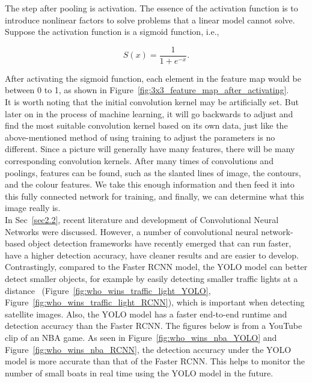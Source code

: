 The step after pooling is activation. The essence of the activation function is to introduce nonlinear factors to solve problems that a linear model cannot solve. Suppose the activation function is a sigmoid function, i.e.,

\begin{equation}
    S(x) =  \frac{\mathrm{1} }{\mathrm{1} + e^{-x} }.
\end{equation}

After activating the sigmoid function, each element in the feature map would be between 0 to 1, as shown in Figure~\ref{fig:3x3_feature_map_after_activating}.\\

It is worth noting that the initial convolution kernel may be artificially set. But later on in the process of machine learning, it will go backwards to adjust and find the most suitable convolution kernel based on its own data, just like the above-mentioned method of using training to adjust the parameters is no different. Since a picture will generally have many features, there will be many corresponding convolution kernels. After many times of convolutions and poolings, features can be found, such as the slanted lines of image, the contours, and the colour features. We take this enough information and then feed it into this fully connected network for training, and finally, we can determine what this image really is.\\

In Sec~\ref{sec2.2}, recent literature and development of Convolutional Neural Networks were discussed. However, a number of convolutional neural network-based object detection frameworks have recently emerged that can run faster, have a higher detection accuracy, have cleaner results and are easier to develop. Contrastingly, compared to the Faster RCNN model, the YOLO model can better detect smaller objects, for example by easily detecting smaller traffic lights at a distance~\cite{Dwivedi2020YOLOv5} (Figure~\ref{fig:who_wins_traffic_light_YOLO}, Figure~\ref{fig:who_wins_traffic_light_RCNN}), which is important when detecting satellite images. Also, the YOLO model has a faster end-to-end runtime and detection accuracy than the Faster RCNN. The figures below is from a YouTube clip of an NBA game. As seen in Figure~\ref{fig:who_wins_nba_YOLO} and Figure~\ref{fig:who_wins_nba_RCNN}, the detection accuracy under the YOLO model is more accurate than that of the Faster RCNN. This helps to monitor the number of small boats in real time using the YOLO model in the future.\\

